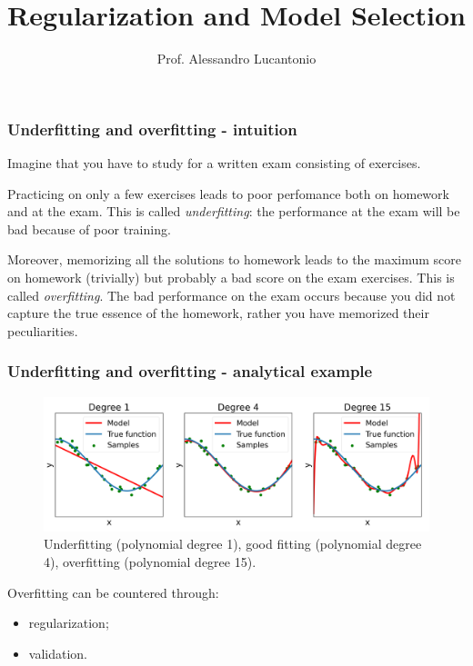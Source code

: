 \documentclass{beamer}
\title{Regularization and Model Selection}
\author{Prof. Alessandro Lucantonio}
\institute{Aarhus University}
\date{}
\begin{document}
	\frame{\titlepage}
	
		\begin{frame}
		\frametitle{Underfitting and overfitting - intuition}
		
		Imagine that you have to study for a written exam consisting of exercises. 
		
		\vspace{5mm}
		
		Practicing on only a few exercises leads to poor perfomance both on homework and at the exam. This is called \textsl{underfitting}: the performance at the exam will be bad because of poor training.
		
		\vspace{5mm}
		
		Moreover, memorizing all the solutions to homework leads to the maximum score on homework (trivially) but probably a bad score on the exam exercises. This is called \textsl{overfitting}. The bad performance on the exam occurs because  you did not capture the true essence of the homework, rather you have memorized their peculiarities.
	\end{frame}
	
	\begin{frame}
		\frametitle{Underfitting and overfitting - analytical example}
		\begin{figure}
			\centering
			\includegraphics[scale=0.35]{images/overfitting_poly}
			\caption{Underfitting (polynomial degree 1), good fitting (polynomial degree 4), overfitting (polynomial degree 15).}
		\end{figure}
		
		Overfitting can be countered through:
		\begin{itemize}
			\item regularization;
			\item validation.
		\end{itemize}
	\end{frame}
	
\end{document}
